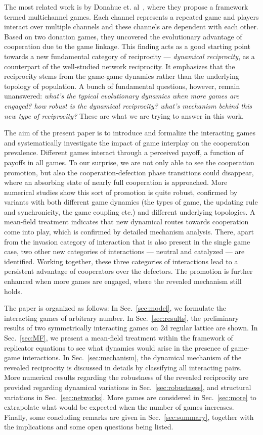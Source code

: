 \documentclass[showpacs,superscriptaddress,reprint,nofootinbib,amsmath,amssymb,aps,pre]{revtex4-1}
\begin{document}
The most related work is by Donahue et. al~\cite{donahue2020evolving}, where they propose a framework termed multichannel games. Each channel represents a repeated game and players interact over multiple channels and these channels are dependent with each other. Based on two donation games, they uncovered the evolutionary advantage of cooperation due to the game linkage. This finding acts as a good starting point towards a new fundamental category of reciprocity --- \emph{dynamical reciprocity}, as a counterpart of the well-studied network reciprocity. It emphasizes that the reciprocity stems from the game-game dynamics rather than the underlying topology of population. A bunch of fundamental questions, however, remain unanswered: \emph{what's the typical evolutionary dynamics when more games are engaged? how robust is the dynamical reciprocity? what's mechanism behind this new type of reciprocity?} These are what we are trying to answer in this work.

The aim of the present paper is to introduce and formalize the interacting games and systematically investigate the impact of game interplay on the cooperation prevalence. Different games interact through a perceived payoff, a function of payoffs in all games. To our surprise, we are not only able to see the cooperation promotion, but also the cooperation-defection phase transitions could disappear, where an absorbing state of nearly full cooperation is approached. More numerical studies show this sort of promotion is quite robust, confirmed by variants with both different game dynamics (the types of game, the updating rule and synchronicity, the game coupling etc.) and different underlying topologies. A mean-field treatment indicates that new dynamical routes towards cooperation come into play, which is confirmed by detailed mechanism analysis. There, apart from the invasion category of interaction that is also present in the single game case, two other new categories of interactions --- neutral and catalyzed --- are identified. Working together, these three categories of interactions lead to a persistent advantage of cooperators over the defectors. The promotion is further enhanced when more games are engaged, where the revealed mechanism still holds.

The paper is organized as follows:
In Sec.~\ref{sec:model}, we formulate the interacting games of arbitrary number. 
In Sec.~\ref{sec:results}, the preliminary results of two symmetrically interacting games on 2d regular lattice are shown.  
In Sec.~\ref{sec:MF}, we present a mean-field treatment within the framework of replicator equations to see what dynamics would arise in the presence of game-game interactions.
In Sec.~\ref{sec:mechanism}, the dynamical mechanism of the revealed reciprocity is discussed in details by classifying all interacting pairs.
More numerical results regarding the robustness of the revealed reciprocity are provided regarding dynamical variations in Sec.~\ref{sec:robustness}, 
and structural variations in Sec.~\ref{sec:networks}. More games are considered in Sec.~\ref{sec:more} to extrapolate what would be expected when the number of games increases.
Finally, some concluding remarks are given in Sec.~\ref{sec:summary}, together with the implications and some open questions being listed.
\end{document}
